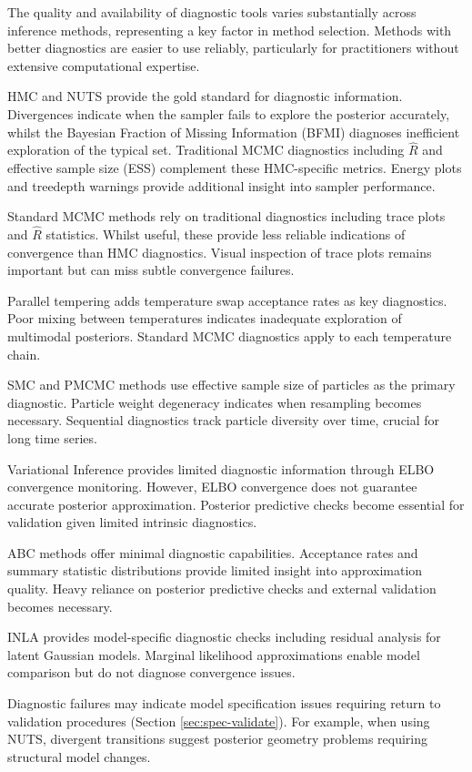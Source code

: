 \documentclass{article}
\begin{document}
The quality and availability of diagnostic tools varies substantially across inference methods, representing a key factor in method selection.
Methods with better diagnostics are easier to use reliably, particularly for practitioners without extensive computational expertise.

HMC and NUTS provide the gold standard for diagnostic information.
Divergences indicate when the sampler fails to explore the posterior accurately, whilst the Bayesian Fraction of Missing Information (BFMI) diagnoses inefficient exploration of the typical set.
Traditional MCMC diagnostics including $\hat{R}$ and effective sample size (ESS) complement these HMC-specific metrics.
Energy plots and treedepth warnings provide additional insight into sampler performance.

Standard MCMC methods rely on traditional diagnostics including trace plots and $\hat{R}$ statistics.
Whilst useful, these provide less reliable indications of convergence than HMC diagnostics.
Visual inspection of trace plots remains important but can miss subtle convergence failures.

Parallel tempering adds temperature swap acceptance rates as key diagnostics.
Poor mixing between temperatures indicates inadequate exploration of multimodal posteriors.
Standard MCMC diagnostics apply to each temperature chain.

SMC and PMCMC methods use effective sample size of particles as the primary diagnostic.
Particle weight degeneracy indicates when resampling becomes necessary.
Sequential diagnostics track particle diversity over time, crucial for long time series.

Variational Inference provides limited diagnostic information through ELBO convergence monitoring.
However, ELBO convergence does not guarantee accurate posterior approximation.
Posterior predictive checks become essential for validation given limited intrinsic diagnostics.

ABC methods offer minimal diagnostic capabilities.
Acceptance rates and summary statistic distributions provide limited insight into approximation quality.
Heavy reliance on posterior predictive checks and external validation becomes necessary.

INLA provides model-specific diagnostic checks including residual analysis for latent Gaussian models.
Marginal likelihood approximations enable model comparison but do not diagnose convergence issues.

Diagnostic failures may indicate model specification issues requiring return to validation procedures (Section \ref{sec:spec-validate}).
For example, when using NUTS, divergent transitions suggest posterior geometry problems requiring structural model changes.
\end{document}
